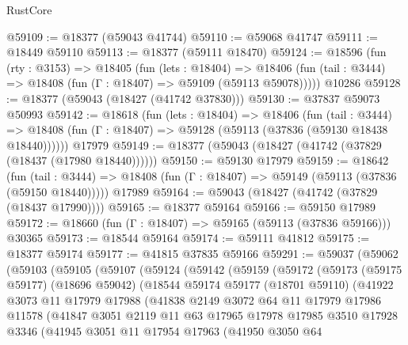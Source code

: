\begin{lexlean}{RustCore}
\begin{coremodule}
@59109 := @18377 (@59043 @41744)
@59110 := @59068 @41747
@59111 := @18449 @59110
@59113 := @18377 (@59111 @18470)
@59124 := @18596
    (fun (rty : @3153) =>
    @18405
      (fun (lets : @18404) =>
      @18406 (fun (tail : @3444) => @18408 (fun (Γ : @18407) => @59109 (@59113 @59078)))))
    @10286
@59128 := @18377 (@59043 (@18427 (@41742 @37830)))
@59130 := @37837 @59073 @50993
@59142 := @18618
    (fun (lets : @18404) =>
    @18406
      (fun (tail : @3444) =>
      @18408 (fun (Γ : @18407) => @59128 (@59113 (@37836 (@59130 @18438 @18440))))))
    @17979
@59149 := @18377 (@59043 (@18427 (@41742 (@37829 (@18437 (@17980 @18440))))))
@59150 := @59130 @17979
@59159 := @18642
    (fun (tail : @3444) => @18408 (fun (Γ : @18407) => @59149 (@59113 (@37836 (@59150 @18440)))))
    @17989
@59164 := @59043 (@18427 (@41742 (@37829 (@18437 @17990))))
@59165 := @18377 @59164
@59166 := @59150 @17989
@59172 := @18660 (fun (Γ : @18407) => @59165 (@59113 (@37836 @59166))) @30365
@59173 := @18544 @59164
@59174 := @59111 @41812
@59175 := @18377 @59174
@59177 := @41815 @37835 @59166
@59291 := @59037
    (@59062
      (@59103
        (@59105
          (@59107
            (@59124
              (@59142
                (@59159
                  (@59172
                    (@59173
                      (@59175 @59177)
                      (@18696 @59042)
                      (@18544
                        @59174
                        @59177
                        (@18701 @59110)
                        (@41922
                          @3073
                          @11
                          @17979
                          @17988
                          (@41838
                            @2149
                            @3072
                            @64
                            @11
                            @17979
                            @17986
                            @11578
                            (@41847
                              @3051
                              @2119
                              @11
                              @63
                              @17965
                              @17978
                              @17985
                              @3510
                              @17928
                              @3346
                              (@41945
                                @3051
                                @11
                                @17954
                                @17963
                                (@41950
                                  @3050
                                  @64

\end{coremodule}
\end{lexlean}
